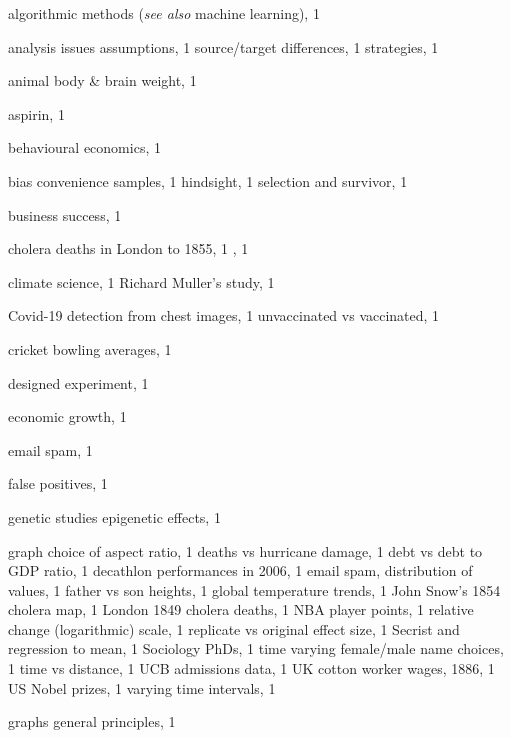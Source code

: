 \documentclass[
  10pt,
  b5paper]{book}
\begin{document}
\begin{theindex}

  \item algorithmic methods (\textit{see also} machine learning), 1
  \item analysis issues
    \subitem assumptions, 1
    \subitem source/target differences, 1
    \subitem strategies, 1
  \item animal body \& brain weight, 1
  \item aspirin, 1

  \indexspace

  \item behavioural economics, 1
  \item bias
    \subitem convenience samples, 1
    \subitem hindsight, 1
    \subitem selection and survivor, 1
  \item business success, 1

  \indexspace

  \item cholera deaths in London
     to 1855, 1
    , 1
  \item climate science, 1
    \subitem Richard Muller's study, 1
  \item Covid-19
    \subitem detection from chest images, 1
    \subitem unvaccinated vs vaccinated, 1
  \item cricket bowling averages, 1

  \indexspace

  \item designed experiment, 1

  \indexspace

  \item economic growth, 1
  \item email spam, 1

  \indexspace

  \item false positives, 1

  \indexspace

  \item genetic studies
    \subitem epigenetic effects, 1
  \item graph
    \subitem choice of aspect ratio, 1
    \subitem deaths vs hurricane damage, 1
    \subitem debt vs debt to GDP ratio, 1
    \subitem decathlon performances in 2006, 1
    \subitem email spam, distribution of values, 1
    \subitem father vs son heights, 1
    \subitem global temperature trends, 1
    \subitem John Snow's 1854 cholera map, 1
    \subitem London 1849 cholera deaths, 1
    \subitem NBA player points, 1
    \subitem relative change (logarithmic) scale, 1
    \subitem replicate vs original effect size, 1
    \subitem Secrist and regression to mean, 1
    \subitem Sociology PhDs, 1
    \subitem time varying female/male name choices, 1
    \subitem time vs distance, 1
    \subitem UCB admissions data, 1
    \subitem UK cotton worker wages, 1886, 1
    \subitem US Nobel prizes, 1
    \subitem varying time intervals, 1
  \item graphs
    \subitem general principles, 1


\end{theindex}
\end{document}
